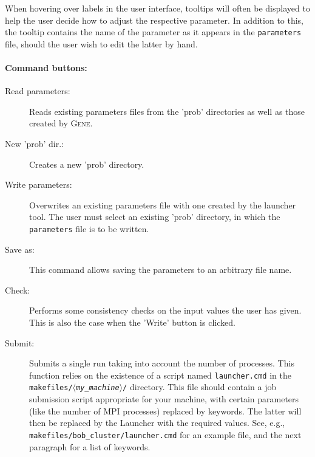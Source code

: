 \documentclass[12pt]{article}
\newcommand{\mach}{$\langle$\textsl{my\_machine}$\rangle$}
\begin{document}
When hovering over labels in the user interface, tooltips will often be displayed to help the user
decide how to adjust the respective parameter. In addition to this, the tooltip contains the
name of the parameter as it appears in the \texttt{parameters} file, should the user wish to
edit the latter by hand.

\paragraph{Command buttons:}
\begin{description}
\item[Read parameters:] Reads existing parameters files from the 'prob' directories as well as those
created by \textsc{Gene}.
\item[New 'prob' dir.:] Creates a new 'prob' directory.
\item[Write parameters:] Overwrites an existing parameters file with one created by the launcher tool.
  The user must select an existing 'prob' directory, in which the \texttt{parameters} file is to be written.
\item[Save as:] This command allows saving the parameters to an arbitrary file name.
\item[Check:] Performs some consistency checks on the input values the user has given. This is also the
case when the 'Write' button is clicked.
\item[Submit:] Submits a single run taking into account the number of processes. This function relies on
the existence of a script named \texttt{launcher.cmd} in the \texttt{makefiles/\mach/} directory. This
file should contain a job submission script appropriate for your machine, with certain parameters (like
the number of MPI processes) replaced by keywords. The latter will then be replaced by the Launcher with
the required values. See, e.g., \texttt{makefiles/bob\_cluster/launcher.cmd} for an example file, and
the next paragraph for a list of keywords.
\end{description}
\end{document}
